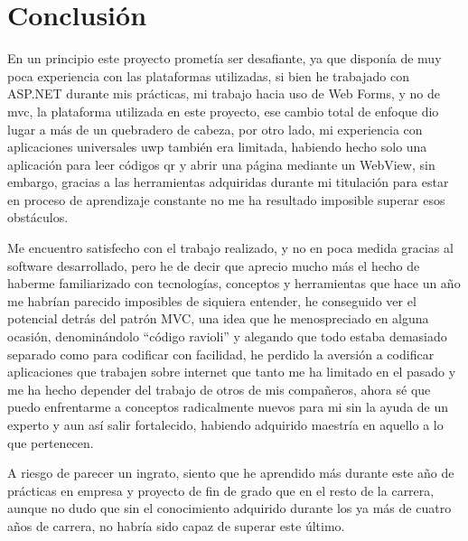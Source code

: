 \chapter{Conclusión}

En un principio este proyecto prometía ser desafiante, ya que disponía de muy poca experiencia con las plataformas utilizadas, si bien he trabajado con ASP.NET durante mis prácticas, mi trabajo hacia uso de Web Forms, y no de \acrshort{mvc}, la plataforma utilizada en este proyecto, ese cambio total de enfoque dio lugar a más de un quebradero de cabeza, por otro lado, mi experiencia con aplicaciones universales \acrshort{uwp} también era limitada, habiendo hecho solo una aplicación para leer códigos \acrshort{qr} y abrir una página mediante un WebView, sin embargo, gracias a las herramientas adquiridas durante mi titulación para estar en proceso de aprendizaje constante no me ha resultado imposible superar esos obstáculos.

Me encuentro satisfecho con el trabajo realizado, y no en poca medida gracias al software desarrollado, pero he de decir que aprecio mucho más el hecho de haberme familiarizado con tecnologías, conceptos y herramientas que hace un año me habrían parecido imposibles de siquiera entender, he conseguido ver el potencial detrás del patrón MVC, una idea que he menospreciado en alguna ocasión, denominándolo “código ravioli” y alegando que todo estaba demasiado separado como para codificar con facilidad, he perdido la aversión a codificar aplicaciones que trabajen sobre internet que tanto me ha limitado en el pasado y me ha hecho depender del trabajo de otros de mis compañeros, ahora sé que puedo enfrentarme a conceptos radicalmente nuevos para mi sin la ayuda de un experto y aun así salir fortalecido, habiendo adquirido maestría en aquello a lo que pertenecen.

A riesgo de parecer un ingrato, siento que he aprendido más durante este año de prácticas en empresa y proyecto de fin de grado que en el resto de la carrera, aunque no dudo que sin el conocimiento adquirido durante los ya más de cuatro años de carrera, no habría sido capaz de superar este último.
